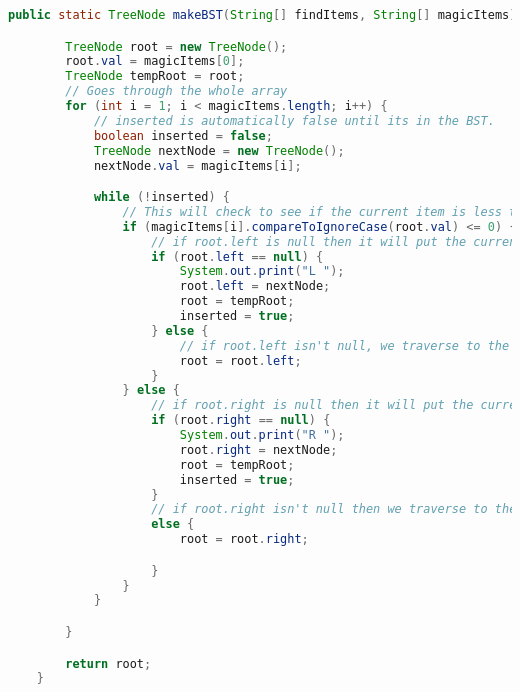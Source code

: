 \documentclass{article}
\begin{document}
\begin{lstlisting}[language = java]
public static TreeNode makeBST(String[] findItems, String[] magicItems) {

        TreeNode root = new TreeNode();
        root.val = magicItems[0];
        TreeNode tempRoot = root;
        // Goes through the whole array
        for (int i = 1; i < magicItems.length; i++) {
            // inserted is automatically false until its in the BST.
            boolean inserted = false;
            TreeNode nextNode = new TreeNode();
            nextNode.val = magicItems[i];

            while (!inserted) {
                // This will check to see if the current item is less than the root value.
                if (magicItems[i].compareToIgnoreCase(root.val) <= 0) {
                    // if root.left is null then it will put the current magic item there.
                    if (root.left == null) {
                        System.out.print("L ");
                        root.left = nextNode;
                        root = tempRoot;
                        inserted = true;
                    } else {
                        // if root.left isn't null, we traverse to the left.
                        root = root.left;
                    }
                } else {
                    // if root.right is null then it will put the current magic item there.
                    if (root.right == null) {
                        System.out.print("R ");
                        root.right = nextNode;
                        root = tempRoot;
                        inserted = true;
                    }
                    // if root.right isn't null then we traverse to the right of the current node
                    else {
                        root = root.right;

                    }
                }
            }

        }

        return root;
    }

\end{lstlisting}
\end{document}
